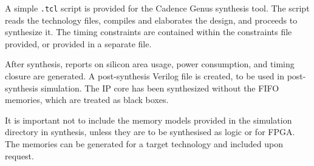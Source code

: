 A simple {\tt .tcl} script is provided for the Cadence Genus synthesis tool. The
script reads the technology files, compiles and elaborates the design, and
proceeds to synthesize it. The timing constraints are contained within the
constraints file provided, or provided in a separate file.

After synthesis, reports on silicon area usage, power consumption, and timing
closure are generated. A post-synthesis Verilog file is created, to be used in
post-synthesis simulation. The IP core has been synthesized without the FIFO
memories, which are treated as black boxes.

It is important not to include the memory models provided in the simulation
directory in synthesis, unless they are to be synthesised as logic or for
FPGA. The memories can be generated for a target technology and included upon
request.


